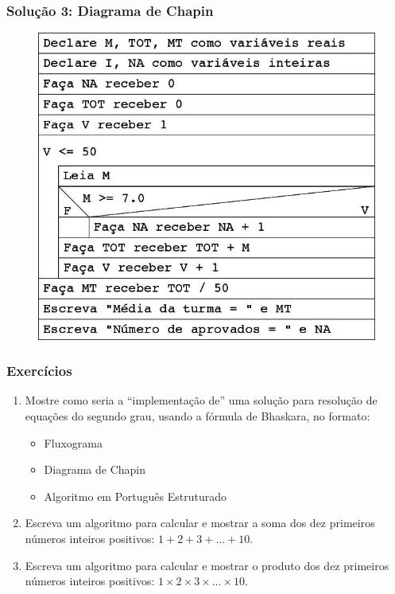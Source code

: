 \documentclass[aspectratio=169]{beamer}
\begin{document}
\begin{frame}\frametitle{Solução 3: Diagrama de Chapin}
\begin{figure}[h]
	\centering
	\includegraphics[height=0.65\paperheight]{pucrs-ep-fprog-unidade_01-introducao-laminas-chapin.jpg}
\end{figure}
\end{frame}

\begin{frame}\frametitle{Exercícios}
\begin{enumerate}
	\item Mostre como seria a ``implementação de'' uma solução para resolução de equações do segundo grau, usando a fórmula de Bhaskara, no formato:
	\begin{itemize}
		\item Fluxograma
		\item Diagrama de Chapin
		\item Algoritmo em Português Estruturado
	\end{itemize}
	\item Escreva um algoritmo para calcular e mostrar a soma dos dez primeiros números inteiros positivos: $1 + 2 + 3 + \ldots + 10$.
	\item Escreva um algoritmo para calcular e mostrar o produto dos dez primeiros números inteiros positivos: $1 \times 2 \times 3 \times \ldots \times 10$.
\end{enumerate}
\end{frame}
\end{document}
